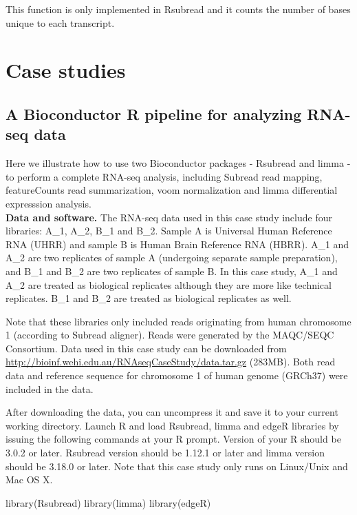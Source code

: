 \documentclass[12pt]{report}
\newcommand{\Subread}{\textsf{Subread}}
\newcommand{\Rsubread}{\textsf{Rsubread}}
\newcommand{\limma}{\textsf{limma}}
\newcommand{\edgeR}{\textsf{edgeR}}
\newcommand{\voom}{\textsf{voom}}
\newcommand{\featureCounts}{\textsf{featureCounts}}
\newcommand{\R}{\textsf{R}}
\begin{document}
This function is only implemented in {\Rsubread} and it counts the number of bases unique to each transcript.

\chapter{Case studies}

\section{A Bioconductor R pipeline for analyzing RNA-seq data}

Here we illustrate how to use two Bioconductor packages - {\Rsubread} and {\limma} - to perform a complete RNA-seq analysis, including {\Subread} read mapping, {\featureCounts} read summarization, {\voom} normalization and {\limma} differential expresssion analysis.\\

{\noindent\bf Data and software.} The RNA-seq data used in this case study include four libraries: A\_1, A\_2, B\_1 and B\_2.
Sample A is Universal Human Reference RNA (UHRR) and sample B is Human Brain Reference RNA (HBRR).
A\_1 and A\_2 are two replicates of sample A (undergoing separate sample preparation), and B\_1 and B\_2 are two replicates of sample B.
In this case study, A\_1 and A\_2 are treated as biological replicates although they are more like technical replicates.
B\_1 and B\_2 are treated as biological replicates as well.

Note that these libraries only included reads originating from human chromosome 1 (according to {\Subread} aligner).
Reads were generated by the MAQC/SEQC Consortium.
Data used in this case study can be downloaded from\\
\url{http://bioinf.wehi.edu.au/RNAseqCaseStudy/data.tar.gz} (283MB).
Both read data and reference sequence for chromosome 1 of human genome (GRCh37) were included in the data.

After downloading the data, you can uncompress it and save it to your current working directory.
Launch {\R} and load {\Rsubread}, {\limma} and {\edgeR} libraries by issuing the following commands at your R prompt.
Version of your {\R} should be 3.0.2 or later.
{\Rsubread} version should be 1.12.1 or later and {\limma} version should be 3.18.0 or later.
Note that this case study only runs on Linux/Unix and Mac OS X.

\begin{Rcode}
library(Rsubread)
library(limma)
library(edgeR)
\end{Rcode}
\end{document}
